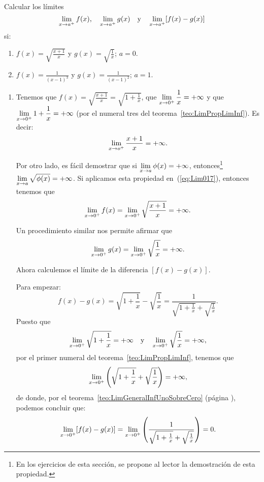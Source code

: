 \begin{exemplo}[Solución]{%
Calcular los límites
\[
\limjc{f(x)}{x}{a^+}, \quad \limjc{g(x)}{x}{a^+} \yjc \limjc{[f(x) - g(x)]}{x}{a^+}
\]
si:
\begin{enumerate}
\item $f(x) = \displaystyle\sqrt{\frac{x + 1}{x}}$ y $g(x) = \displaystyle\sqrt{\frac{1}{x}}$;
    $a = 0$.
\item $f(x) = \displaystyle\frac{1}{(x - 1)^3}$ y $g(x) = \displaystyle\frac{1}{(x - 1)^2}$; $a
    = 1$.
\end{enumerate}}
\begin{enumerate}[leftmargin=*]
\item Tenemos que $\displaystyle f(x) = \sqrt{\frac{x + 1}{x}} = \sqrt{1 + \frac{1}{x}}$, que
    $\displaystyle\limjc{\frac{1}{x}}{x}{0^+} = + \infty$ y que $\displaystyle\limjc{1 +
    \frac{1}{x}}{x}{0^+} = + \infty$ (por el numeral tres del teorema~\ref{teo:LimPropLimInf}).
    Es decir:
    \begin{equation}
    \label{eq:Lim017}
    \limjc{\frac{x + 1}{x}}{x}{o^+} = +\infty.
    \end{equation}

    Por otro lado, es fácil demostrar que si $\displaystyle\limjc{\phi(x)}{x}{a} = +\infty$,
    entonces\footnote{En los ejercicios de esta sección, se propone al lector la demostración
    de esta propiedad.} $\displaystyle\limjc{\sqrt{\phi(x)}}{x}{a} = +\infty$. Si aplicamos
    esta propiedad en~(\ref{eq:Lim017}), entonces tenemos que
    \[
      \limjc{f(x)}{x}{0^+} = \limjc{\sqrt{\frac{x+1}{x}}}{x}{0^+} = +\infty.
    \]

    Un procedimiento similar nos permite afirmar que
    \[
      \limjc{g(x)}{x}{0^+} = \limjc{\sqrt{\frac{1}{x}}}{x}{0^+} = +\infty.
    \]

    Ahora calculemos el límite de la diferencia $[f(x) - g(x)]$.

    Para empezar:
    \[
    f(x) - g(x) = \sqrt{1 + \frac{1}{x}} - \sqrt{\frac{1}{x}}
    = \frac{1}{\sqrt{1 + \frac{1}{x}} + \sqrt{\frac{1}{x}}}.
    \]
    Puesto que
    \[
      \limjc{\sqrt{1 + \frac{1}{x}}}{x}{0^+} = +\infty \yjc
      \limjc{\sqrt{\frac{1}{x}}}{x}{0^+} = +\infty,
    \]
    por el primer numeral del teorema~\ref{teo:LimPropLimInf}, tenemos que
    \[
      \limjc{\left(\sqrt{1 + \frac{1}{x}} + \sqrt{\frac{1}{x}}\right)}{x}{0^+} = +\infty,
    \]
    de donde, por el teorema~\ref{teo:LimGeneralInfUnoSobreCero} (página
    \pageref{teo:LimGeneralInfUnoSobreCero}), podemos concluir que:
    \[
      \limjc{[f(x) - g(x)]}{x}{0^+} =
      \limjc{\left(\frac{1}{\sqrt{1 + \frac{1}{x}} + \sqrt{\frac{1}{x}}}\right)}{x}{0^+} = 0.
    \]


\end{enumerate}
\end{exemplo}
